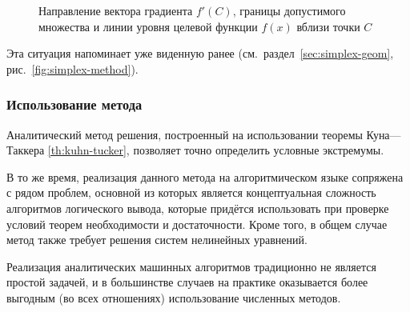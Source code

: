\begin{itemize}
\begin{figure}[!h]
    \caption[Задача условной оптимизации вблизи одной из стационарных
    точек]{Направление вектора градиента $f'(C)$, границы допустимого
      множества и линии уровня целевой функции $f(x)$ вблизи точки
      $C$}
    \label{fig:cond-optim-zoom}
  \end{figure}

  Эта ситуация напоминает уже виденную ранее
  (см. раздел \ref{sec:simplex-geom}, рис. \ref{fig:simplex-method}).
\end{itemize}

\subsubsection{Использование метода}

Аналитический метод решения, построенный на использовании теоремы
Куна—Таккера \ref{th:kuhn-tucker}, позволяет точно определить условные
экстремумы.

В то же время, реализация данного метода на алгоритмическом языке
сопряжена с рядом проблем, основной из которых является концептуальная
сложность алгоритмов логического вывода, которые придётся использовать
при проверке условий теорем необходимости и достаточности. Кроме того,
в общем случае метод также требует решения систем нелинейных
уравнений.

Реализация аналитических машинных алгоритмов традиционно не является
простой задачей, и в большинстве случаев на практике оказывается более
выгодным (во всех отношениях) использование численных методов.
